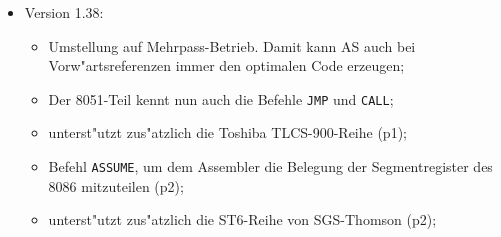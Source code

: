 \documentclass[12pt,a4paper,twoside]{report}
\newcommand{\tty}[1]{{\tt #1}}
\newcommand{\asname}{AS}
\newcommand{\predefsym}[1]{{\tt (\_)#1}}
\begin{document}
\begin{itemize}
{\begin{itemize}
      \item{P2HEX kann nun auch Hexfiles f"ur 65er-Prozessoren erzeugen;}
      \item{BIND, P2HEX und P2BIN haben jetzt die gleichen
            Variationsm"oglichkeiten in der Kommandozeile wie \asname{};}
      \item{Schalter \tty{i} bei P2HEX, um 3 Varianten f"ur den Ende-Record
            einzustellen;}
      \item{Neue Funktionen \tty{ABS} und \tty{SGN};}
      \item{Neue Pseudovariablen \predefsym{MOMFILE} und \predefsym{MOMLINE};}
      \item{Ausgabem"oglichkeit erweiterter Fehlermeldungen;}
      \item{Befehle \tty{IFUSED} und \tty{IFNUSED}, um abzufragen, ob ein
            Symbol bisher benutzt wurde;}
      \item{Die Environment-Variablen \tty{ASCMD}, \tty{BINDCMD} usw. k"onnen auch
            einen Dateinamen enthalten, in dem f"ur die Optionen mehr
            Platz ist;}
      \item{P2HEX erzeugt nun die von Microchip vorgegebenen Hex-Formate
            (p4);}
      \item{mit der Seitenl"angenangabe 0 k"onnen automatische
            Seitenvorsch"ube im Listing vollst"andig unterdr"uckt werden
            (p4);}
      \item{neue Kommandozeilenoption \tty{P}, um die Ausgabe des Makroprozessors
            in eine Datei zu schreiben (p4);}
      \item{in der Kommandozeile definierte Symbole d"urfen nun auch mit
            einem frei w"ahlbaren Wert belegt werden (p5).}
      \end{itemize}}
\item{Version 1.38:
      \begin{itemize}
      \item{Umstellung auf Mehrpass-Betrieb.  Damit kann \asname{} auch bei
            Vorw"artsreferenzen immer den optimalen Code erzeugen;}
      \item{Der 8051-Teil kennt nun auch die Befehle \tty{JMP} und \tty{CALL};}
      \item{unterst"utzt zus"atzlich die Toshiba TLCS-900-Reihe (p1);}
      \item{Befehl \tty{ASSUME}, um dem Assembler die Belegung der
            Segmentregister des 8086 mitzuteilen (p2);}
      \item{unterst"utzt zus"atzlich die ST6-Reihe von SGS-Thomson (p2);}

\end{itemize}}
\end{itemize}
\end{document}
